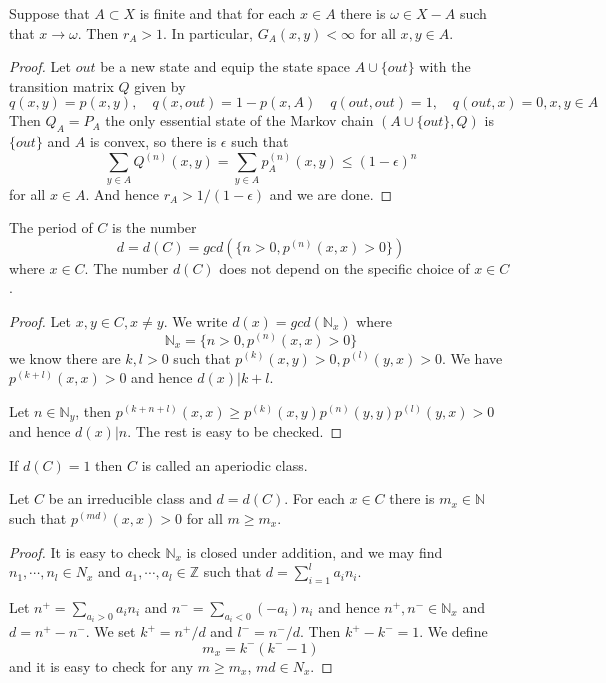 \documentclass[lang=en, color=blue, ]{elegantbook}
\newcommand{\N}{\mathbb{N}}
\newcommand{\Z}{\mathbb{Z}}
\begin{document}
\begin{lemma}
    Suppose that $A\subset X$ is finite and that for each $x\in A$ there is $\omega\in X-A$ such that $x\to\omega$. Then $r_A > 1$. In particular, $G_A(x,y) < \infty$ for all $x,y \in A$.
\end{lemma}
\begin{proof}
    Let $out$ be a new state and equip the state space $A\cup\{out\}$ with the transition matrix $Q$ given by
    \[
    q(x,y) = p(x,y),\quad q(x,out) = 1-p(x,A)\quad q(out,out) = 1,\quad q(out,x) = 0, x,y\in A
    \]
    Then $Q_A = P_A$ the only essential state of the Markov chain $(A\cup\{out\}, Q)$ is $\{out\}$ and $A$ is convex, so there is $\epsilon$ such that
    \[
    \sum\limits_{y \in A}Q^{(n)}(x,y) = \sum\limits_{y\in A}p_A^{(n)}(x,y) \leq (1-\epsilon)^n
    \]
    for all $x\in A$. And hence $r_A > 1/(1-\epsilon)$ and we are done.
\end{proof}

\begin{definition}
    The period of $C$ is the number
    \[
    d = d(C) = gcd(\{n>0,p^{(n)}(x,x) > 0\})
    \]
    where $x\in C$. The number $d(C)$ does not depend on the specific choice of $x\in C$.
\end{definition}
\begin{proof}
    Let $x,y\in C, x\neq y$. We write $d(x) = gcd(\N_x)$ where
    \[\N_x = \{n>0,p^{(n)}(x,x) > 0\}\]
    we know there are $k,l > 0$ such that $p^{(k)}(x,y)>0,p^{(l)}(y,x)>0$. We have $p^{(k+l)}(x,x)>0$ and hence $d(x)|k+l$.\par
    Let $n\in\N_y$, then $p^{(k+n+l)}(x,x) \geq p^{(k)}(x,y)p^{(n)}(y,y)p^{(l)}(y,x) > 0$ and hence $d(x)|n$. The rest is easy to be checked.
\end{proof}

\begin{definition}
    If $d(C) = 1$ then $C$ is called an aperiodic class.
\end{definition}

\begin{lemma}
    Let $C$ be an irreducible class and $d = d(C)$. For each $x\in C$ there is $m_x \in \N$ such that $p^{(md)}(x,x) > 0$ for all $m\geq m_x$. 
\end{lemma}
\begin{proof}
    It is easy to check $\N_x$ is closed under addition, and we may find $n_1,\cdots,n_l \in N_x$ and $a_1,\cdots,a_l \in \Z$ such that $d = \sum\limits_{i=1}^l a_i n_i$.\par
    Let $n^+ = \sum\limits_{a_i > 0} a_i n_i$ and $n^- = \sum\limits_{a_i < 0} (-a_i)n_i$ and hence $n^+,n^- \in\N_x$ and $d = n^+-n^-$. We set $k^+ = n^+/d$ and $l^- = n^-/d$. Then $k^+-k^-  = 1$. We define
    \[m_x = k^-(k^--1)\]
    and it is easy to check for any $ m \geq m_x$, $md \in N_x$.
\end{proof}
\end{document}
